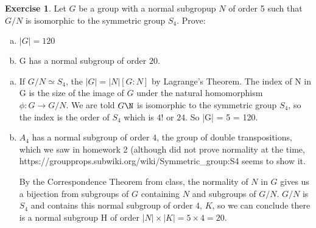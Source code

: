 \documentclass[11pt,oneside]{article}
\numberwithin{equation}{section}
\theoremstyle{definition}
\newtheorem{exercise}{Exercise}
\begin{document}
  \begin{exercise}
    Let $G$ be a group with a normal subgropup $N$ of order 5 such that $G/N$ is isomorphic to the
    symmetric group $S_4$.  Prove:
    \begin{enumerate}[(a)]
    \item
      $|G| = 120$
    \item
      G has a normal subgroup of order $20$.  
    \end{enumerate}
  \end{exercise}
  \begin{solution}
    \begin{enumerate}[(a)]
    \item
      If $G/N \simeq S_4$, the $|G| = |N| [G:N]$ by Lagrange's
      Theorem.  The index of N in G is the size of the image of $G$
      under the natural homomorphism $\phi: G \to G/N$.  We are told
      $G\N$ is isomorphic to the symmetric group $S_4$, so the index is the
      order of $S_4$ which is $4!$ or $24$.  So |G| = 5  = 120.
    \item
      $A_4$ has a normal subgroup of order $4$, the group of double
      transpositions, which we saw in homework 2 (although did not
      prove normality at the time,
      https://groupprops.subwiki.org/wiki/Symmetric_group:S4 seems to
      show it.

      By the Correspondence Theorem from class, the normality of $N$
      in $G$ gives us a bijection from subgroups of $G$ containing $N$
      and subgroups of $G/N$.  $G/N$ is $S_4$ and contains this normal
      subgroup of order $4$, $K$, so we can conclude there is a normal subgroup H
      of order $ |N| \times  |K| = 5 \times 4 = 20$.  
      
    \end{enumerate}
  \end{solution}


\begin{comment}
  \begin{exercise}
    problem
  \end{exercise}
  \begin{solution}
    \begin{enumerate}[(a)]
    \item
      first answer
    \end{enumerate}
  \end{solution}
\end{comment}
\end{document}
